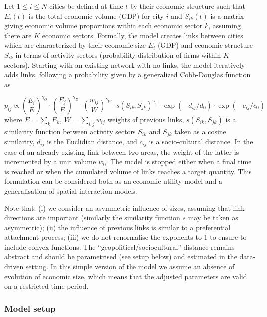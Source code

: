 \documentclass[10pt,letterpaper]{article}
\begin{document}
Let $1 \leq i \leq N$ cities be defined at time $t$ by their economic structure such that $E_i(t)$ is the total economic volume (GDP) for city $i$ and $S_{ik}(t)$ is a matrix giving economic volume proportions within each economic sector $k$, assuming there are $K$ economic sectors. Formally, the model creates links between cities which are characterized by their economic size $E_i$ (GDP) and economic structure $S_{ik}$ in terms of activity sectors (probability distribution of firms within $K$ sectors). Starting with an existing network with no links, the model iteratively adds links, following a probability given by a generalized Cobb-Douglas function \cite{vilcu2011geometric} as 

\begin{equation}
p_{ij} \propto \left(\frac{E_{i}}{E}\right)^{\gamma_O} \cdot \left(\frac{E_{j}}{E}\right)^{\gamma_D} \cdot \left(\frac{w_{ij}}{W}\right)^{\gamma_W} \cdot s\left(S_{ik},S_{jk}\right)^{\gamma_S} \cdot \exp \left(- d_{ij} / d_0\right) \cdot \exp \left(- c_{ij} / c_0\right)
\end{equation}
where $E  =  \sum_k E_k$, $W  = \sum_{i,j} w_{ij}$ weights of previous links, $s(S_{ik},S_{jk})$ is a similarity function between activity sectors $S_{ik}$ and $S_{jk}$ taken as a cosine similarity, $d_{ij}$ is the Euclidian distance, and $c_{ij}$ is a socio-cultural distance. In the case of an already existing link between two areas, the weight of the latter is incremented by a unit volume $w_0$. The model is stopped either when a final time is reached or when the cumulated volume of links reaches a target quantity. This formulation can be considered both as an economic utility model and a generalisation of spatial interaction models.



Note that: (i) we consider an asymmetric influence of sizes, assuming that link directions are important (similarly the similarity function $s$ may be taken as asymmetric); (ii) the influence of previous links is similar to a preferential attachment process; (iii) we do not renormalise the exponents to 1 to ensure to include convex functions. The ``geopolitical/sociocultural'' distance remains abstract and should be parametrised (see setup below) and estimated in the data-driven setting. In this simple version of the model we assume an absence of evolution of economic size, which means that the adjusted parameters are valid on a restricted time period.


\subsubsection*{Model setup}
\end{document}
